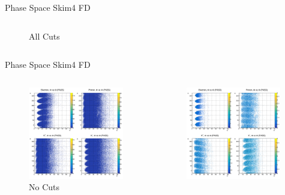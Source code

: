 \documentclass[aspectratio=169]{beamer}
\begin{document}
\begin{frame}{Phase Space  \hfill Skim4 FD}
\begin{columns}
\begin{figure}
        \caption{All Cuts}
    \end{figure}
    \end{columns}
\end{frame}

\begin{frame}{Phase Space  \hfill Skim4 FD}
\vspace*{-0.6cm}
    \begin{columns}
    \begin{figure}
        \centering
        \includegraphics[width=0.97\textwidth]{pdfs/hists/PASS/ThetaPhi.png}
        \caption{No Cuts}
    \end{figure}
    \begin{figure}
        \centering
        \includegraphics[width=0.97\textwidth]{pdfs/all_cuts/PASS/ThetaPhi.png}

\end{figure}
\end{columns}
\end{frame}
\end{document}

